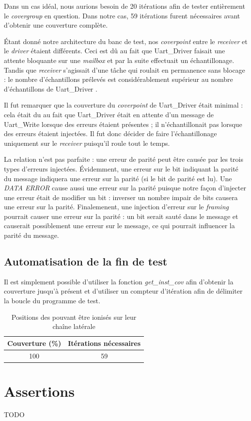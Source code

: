 \documentclass[12pt, titlepage]{article}
\newcommand{\uwriter}{Uart\_Write }
\newcommand{\udriver}{Uart\_Driver }
\newcommand{\cvp}{\emph{coverpoint }}                \newcommand{\cvg}{\emph{covergroup }}
\begin{document}
		Dans un cas idéal, nous aurions besoin de 20 itérations afin de tester entièrement le \cvg en question. Dans notre cas, 59 itérations furent nécessaires avant d'obtenir une couverture complète.
		
		Étant donné notre architecture du banc de test, nos \cvp entre le \emph{receiver} et le \emph{driver} étaient différents. Ceci est dû au fait que \udriver faisait une attente bloquante sur une \emph{mailbox} et par la suite effectuait un échantillonage. Tandis que \emph{receiver} s'agissait d'une tâche qui roulait en permanence sans blocage : le nombre d'échantillons prélevés est considérablement supérieur au nombre d'échantillons de \udriver. 

		
		Il fut remarquer que la couverture du \cvp de \udriver était minimal : cela était du au fait que \udriver était en attente d'un message de \uwriter lorsque des erreurs étaient présentes ; il n'échantillonait pas lorsque des erreurs étaient injectées. Il fut donc décider de faire l'échantillonage uniquement sur le \emph{receiver} puisqu'il roule tout le temps. 

		La relation n'est pas parfaite : une erreur de parité peut être causée par les trois types d'erreurs injectées.
		Évidemment, une erreur sur le bit indiquant la parité du message indiquera une erreur sur la parité (si le bit de parité est lu).
		Une \emph{DATA ERROR} cause aussi une erreur sur la parité puisque notre façon d'injecter une erreur était de modifier un bit : inverser un nombre impair de bits causera une erreur sur la parité.
		Finalemenent, une injection d'erreur sur le \emph{framing} pourrait causer une erreur sur la parité : un bit serait sauté dans le message et causerait possiblement une erreur sur le message, ce qui pourrait influencer la parité du message.
		
    \subsection{Automatisation de la fin de test} 
    	Il est simplement possible d'utiliser la fonction \emph{get\_inst\_cov} afin d'obtenir la couverture jusqu'à présent et d'utiliser un compteur d'itération afin de délimiter la boucle du programme de test.
    	
    	 \begin{table}[h!]
			 	\begin{center}
			 		\caption{Positions des pouvant être ionisés sur leur chaîne latérale}
			 		\label{tab:posIonisables}
			 		\begin{tabular}{c|c}
			 			Couverture (\%) & Itérations nécessaires\\
			 			\midrule
						   100   & 59 \\
			 		\end{tabular}
			 	\end{center}
		 \end{table}
    	
\section{Assertions}
    TODO
\end{document}
